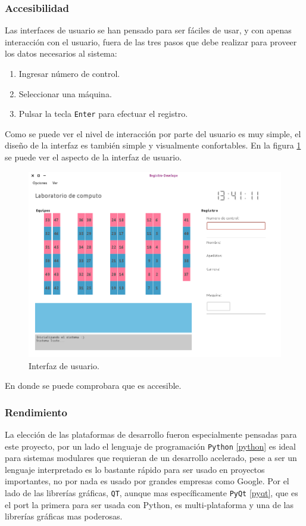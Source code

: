 \documentclass[12pt]{article} %
\begin{document}
		\subsubsection{Accesibilidad}
			Las interfaces de usuario se han pensado para ser fáciles de usar, y con apenas interacción con el usuario, fuera de las tres pasos que debe realizar para proveer 
			los datos necesarios al sistema:
			\begin{enumerate}
				\item Ingresar n\'umero de control.
				\item Seleccionar una m\'aquina.
				\item Pulsar la tecla \texttt{Enter} para efectuar el registro.
			\end{enumerate}
			Como se puede ver el nivel de interacción por parte del usuario es muy simple, el dise\~no de la interfaz es también simple y visualmente confortables.
			En la figura \ref{user_gui} se puede ver el aspecto de la interfaz de usuario.
			\begin{figure}[h!]%
				\centering
				\includegraphics[scale=0.5]{./imagenes/user_gui}
				\caption{Interfaz de usuario.}\label{user_gui}
			\end{figure}
			En donde se puede comprobara que es accesible.

		\subsubsection{Rendimiento}
			La elección de las plataformas de desarrollo fueron especialmente pensadas para este proyecto, por un lado el lenguaje de programación  \texttt{Python} \ref{python}
			es ideal para sistemas modulares que requieran de un desarrollo acelerado, pese a ser un lenguaje interpretado es lo bastante rápido para ser usado en proyectos
			importantes, no por nada es usado por grandes empresas como \textsf{Google}.
			Por el lado de las librerías gráficas, \texttt{QT}, aunque mas específicamente \texttt{PyQt} \ref{pyqt}, que es el port la primera para ser usada con Python, es
			multi-plataforma y una de las librerías gráficas mas poderosas.
			
\end{document}

